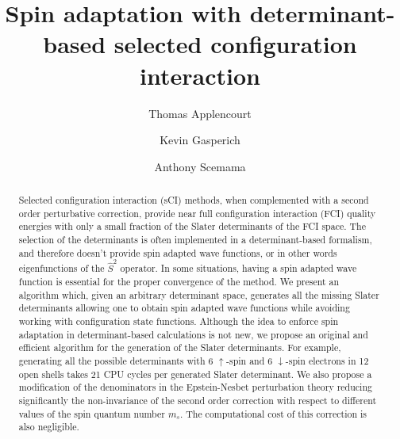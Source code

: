 \documentclass[aip,jcp,reprint,showkeys]{revtex4-1}
\newcommand{\stwo}{\hat{S}^2}
\newcommand{\up}{\uparrow}
\newcommand{\dn}{\downarrow}
\newcommand{\sci}{sCI}
\newcommand{\cpu}{CPU}
\begin{document}
\title{Spin adaptation with determinant-based selected configuration
interaction}

\author{Thomas Applencourt}
\author{Kevin Gasperich}
\author{Anthony Scemama}

\begin{abstract}
Selected configuration interaction (\sci) methods, when complemented with
a second order perturbative correction, provide near full configuration interaction (FCI)
quality energies with only a small fraction of the Slater determinants of the FCI
space. The selection of the determinants is often implemented in a determinant-based 
formalism, and therefore doesn't provide spin adapted wave functions, or in
other words eigenfunctions of the $\stwo$ operator. In some situations, having a spin
adapted wave function is essential for the proper convergence of the method.
We present an algorithm which, given an arbitrary
determinant space, generates all the missing Slater determinants allowing one to
obtain spin adapted wave functions while avoiding working with configuration
state functions. Although the idea to enforce spin adaptation in
determinant-based calculations is not new, we propose an original and 
efficient algorithm for the generation of the Slater determinants. For example,
generating all the possible determinants with 6 $\up$-spin and 6 $\dn$-spin
electrons in 12 open shells takes 21 \cpu{} cycles per generated Slater
determinant. We also propose a modification of the denominators in the
Epstein-Nesbet perturbation theory reducing significantly the non-invariance of
the second order correction with respect to different values of the spin
quantum number $m_s$. The computational cost of this correction is also
negligible.
\end{abstract}


\maketitle
\end{document}
